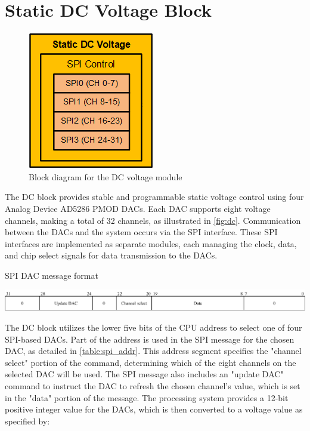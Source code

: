 \section{Static DC Voltage Block}
\begin{figure}[h]
    \centering
    \includegraphics[width=0.5\linewidth]{figures/5.2.png}
    \caption{Block diagram for the DC voltage module}
    \label{fig:dc}
\end{figure}
The DC block provides stable and programmable static voltage control using four Analog Device AD5286 PMOD DACs. Each DAC supports eight voltage channels, making a total of 32 channels, as illustrated in \autoref{fig:dc}. Communication between the DACs and the system occurs via the SPI interface. These SPI interfaces are implemented as separate modules, each managing the clock, data, and chip select signals for data transmission to the DACs.

\begin{table}[h]
\centering

\caption{SPI DAC message format}

\includegraphics[width=1.0\textwidth]{figures/spi_addr.png}
\label{table:spi_addr}
\end{table}

The DC block utilizes the lower five bits of the CPU address to select one of four SPI-based DACs. Part of the address is used in the SPI message for the chosen DAC, as detailed in \autoref{table:spi_addr}. This address segment specifies the "channel select" portion of the command, determining which of the eight channels on the selected DAC will be used. The SPI message also includes an "update DAC" command to instruct the DAC to refresh the chosen channel's value, which is set in the "data" portion of the message. The processing system provides a 12-bit positive integer value for the DACs, which is then converted to a voltage value as specified by:

